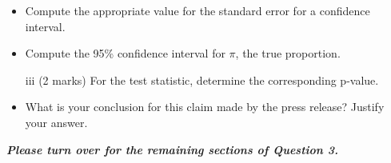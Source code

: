 \begin{itemize}



\begin{itemize}

\item  Compute the appropriate value for the standard error for a confidence interval.

\item  Compute the 95\% confidence interval for $\pi$, the true proportion.
%
\item[iii] (2 marks) For the test statistic, determine the corresponding p-value.

\item  What is your conclusion for this claim made by the press release? Justify your answer.
\end{itemize}
\end{itemize}
{
\normalsize
\textit{\textbf{Please turn over for the remaining sections of Question 3.}}
}
%
